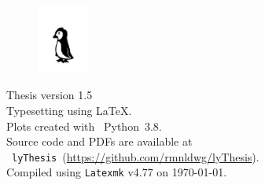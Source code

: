 \documentclass[\relativeRoot/main.tex]{subfiles}
\begin{document}
\printglossary[
    title={Abbreviations},
    type=acronym,
    style=long
]
    
\printbibliography[
    title={Bibliography},
    heading=bibintoc
]

\cleardoublepage
{}
{}
\listoffigures

\cleardoublepage
{}
{}
\listoftables

\cleardoublepage
\vspace*{\fill}

\begin{figure}[h]
    \centering
    \includegraphics[width=0.15\textwidth]{figures/pingu.png}
\end{figure}

\begin{center}
    Thesis version 1.5\\
    Typesetting using \LaTeX.\\
    Plots created with ~Python~3.8.\\
    Source code and PDFs are available at\\
    ~\texttt{lyThesis}~{\footnotesize(\url{https://github.com/rmnldwg/lyThesis})}.\\
    Compiled using \texttt{Latexmk} v4.77 on \today.
\end{center}

\vspace*{\fill}
\end{document}
